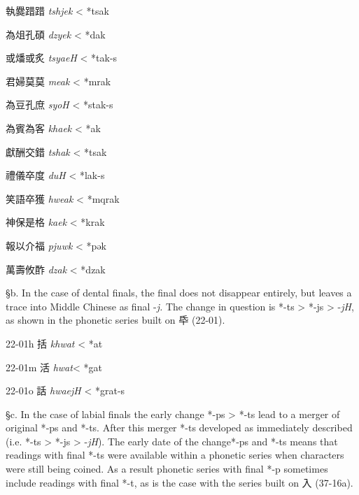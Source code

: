 \begin{description} \item
執爨踖踖  \emph{tshjek} \textless{} *ts{}ak

\item
為俎孔碩  \emph{dzyek} \textless{} *dak

\item
或燔或炙  \emph{tsyaeH} \textless{} *tak-s

\item
君婦莫莫  \emph{meak} \textless{} *mr{}ak

\item
為豆孔庶  \emph{syoH} \textless{} *stak-s

\item
為賓為客  \emph{khaek} \textless{} *{}ak

\item
獻酬交錯  \emph{tshak} \textless{} *ts{}{}ak

\item
禮儀卒度  \emph{duH} \textless{} *l{}ak-s

\item
笑語卒獲  \emph{hweak} \textless{} *mq{}rak

\item
神保是格  \emph{kaek} \textless{} *kr{}ak

\item
報以介福  \emph{pjuwk} \textless{} *pək

\item
萬壽攸酢  \emph{dzak} \textless{} *dz{}ak
\end{description}

§b. In the case of dental finals, the final does not disappear entirely,
but leaves a trace into Middle Chinese as final -\emph{j. }The change in
question is *-ts \textgreater{} *-js \textgreater{} -\emph{jH}, as shown
in the phonetic series built on 氒 (22-01).

\begin{description} \item
22-01h 括  \emph{khwat} \textless{} *{}at

\item
22-01m 活  \emph{hwat}\textless{} *g{}at

\item
22-01o 話 \emph{hwaejH} \textless{} *g{}r{}at-s
\end{description}

§c. In the case of labial finals the early change *-ps \textgreater{}
*-ts lead to a merger of original *‑ps and *-ts. After this merger *-ts
developed as immediately described (i.e. *-ts \textgreater{} *-js
\textgreater{} -\emph{jH}). The early date of the change*‑ps and *-ts
means that readings with final *-ts were available within a phonetic
series when characters were still being coined. As a result phonetic
series with final *-p sometimes include readings with final *-t, as is
the case with the series built on 入 (37-16a).

